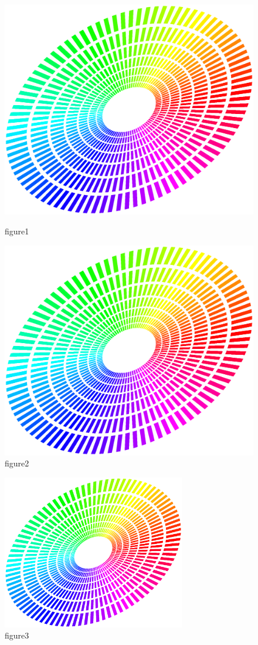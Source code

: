 \documentclass{ecsthesis}       %
\begin{document}
\begin{figure}[!htb]
	\centering
	\begin{minipage}[b]{0.45\textwidth}
		\centering
		\includegraphics[width=0.8\linewidth]{figure}
		\caption{figure1}
		\label{fig:figure1}
	\end{minipage}
	\hfill
	\begin{minipage}[b]{0.45\textwidth}
		\centering
		\includegraphics[width=0.6\linewidth]{figure}
		\caption{figure2}
		\label{fig:figure2}
	\end{minipage}
\end{figure}

\begin{figure}[!htb]
	\centering
	\includegraphics[width=8cm]{figure}
	\caption{figure3}
	\label{Figure:figure3}
\end{figure}
\end{document}

